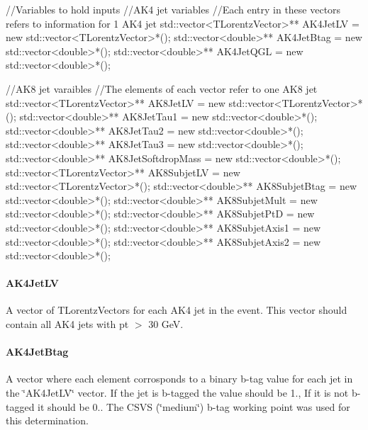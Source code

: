 \begin{DoxyCode}
\textcolor{comment}{//Variables to hold inputs}
\textcolor{comment}{//AK4 jet variables}
\textcolor{comment}{//Each entry in these vectors refers to information for 1 AK4 jet}
std::vector<TLorentzVector>** AK4JetLV = \textcolor{keyword}{new} std::vector<TLorentzVector>*();
std::vector<double>** AK4JetBtag = \textcolor{keyword}{new} std::vector<double>*();
std::vector<double>** AK4JetQGL = \textcolor{keyword}{new} std::vector<double>*();

\textcolor{comment}{//AK8 jet varaibles}
\textcolor{comment}{//The elements of each vector refer to one AK8 jet}
std::vector<TLorentzVector>** AK8JetLV = \textcolor{keyword}{new} std::vector<TLorentzVector>*();
std::vector<double>** AK8JetTau1 = \textcolor{keyword}{new} std::vector<double>*();
std::vector<double>** AK8JetTau2 = \textcolor{keyword}{new} std::vector<double>*();
std::vector<double>** AK8JetTau3 = \textcolor{keyword}{new} std::vector<double>*();
std::vector<double>** AK8JetSoftdropMass = \textcolor{keyword}{new} std::vector<double>*();
std::vector<TLorentzVector>** AK8SubjetLV = \textcolor{keyword}{new} std::vector<TLorentzVector>*();
std::vector<double>** AK8SubjetBtag  = \textcolor{keyword}{new} std::vector<double>*();
std::vector<double>** AK8SubjetMult  = \textcolor{keyword}{new} std::vector<double>*();
std::vector<double>** AK8SubjetPtD   = \textcolor{keyword}{new} std::vector<double>*();
std::vector<double>** AK8SubjetAxis1 = \textcolor{keyword}{new} std::vector<double>*();
std::vector<double>** AK8SubjetAxis2 = \textcolor{keyword}{new} std::vector<double>*();
\end{DoxyCode}


\paragraph*{A\-K4\-Jet\-L\-V}

A vector of T\-Lorentz\-Vectors for each A\-K4 jet in the event. This vector should contain all A\-K4 jets with pt $>$ 30 Ge\-V.

\paragraph*{A\-K4\-Jet\-Btag}

A vector where each element corrosponds to a binary b-\/tag value for each jet in the \char`\"{}\-A\-K4\-Jet\-L\-V\char`\"{} vector. If the jet is b-\/tagged the value should be 1., If it is not b-\/tagged it should be 0.. The C\-S\-V\-S (\char`\"{}medium\char`\"{}) b-\/tag working point was used for this determination.


